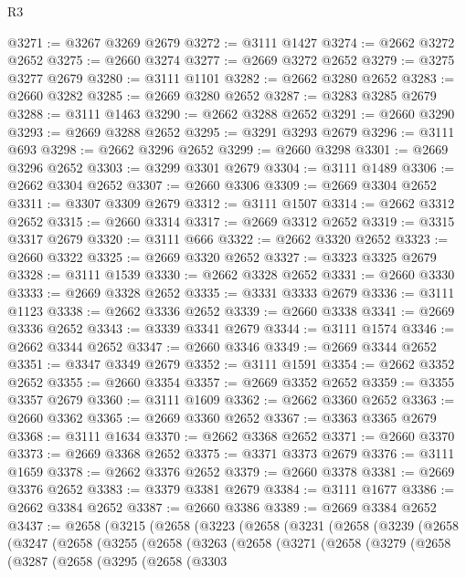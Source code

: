 \begin{lexlean}{R3}
\begin{coremodule}
@3271 := @3267 @3269 @2679
@3272 := @3111 @1427
@3274 := @2662 @3272 @2652
@3275 := @2660 @3274
@3277 := @2669 @3272 @2652
@3279 := @3275 @3277 @2679
@3280 := @3111 @1101
@3282 := @2662 @3280 @2652
@3283 := @2660 @3282
@3285 := @2669 @3280 @2652
@3287 := @3283 @3285 @2679
@3288 := @3111 @1463
@3290 := @2662 @3288 @2652
@3291 := @2660 @3290
@3293 := @2669 @3288 @2652
@3295 := @3291 @3293 @2679
@3296 := @3111 @693
@3298 := @2662 @3296 @2652
@3299 := @2660 @3298
@3301 := @2669 @3296 @2652
@3303 := @3299 @3301 @2679
@3304 := @3111 @1489
@3306 := @2662 @3304 @2652
@3307 := @2660 @3306
@3309 := @2669 @3304 @2652
@3311 := @3307 @3309 @2679
@3312 := @3111 @1507
@3314 := @2662 @3312 @2652
@3315 := @2660 @3314
@3317 := @2669 @3312 @2652
@3319 := @3315 @3317 @2679
@3320 := @3111 @666
@3322 := @2662 @3320 @2652
@3323 := @2660 @3322
@3325 := @2669 @3320 @2652
@3327 := @3323 @3325 @2679
@3328 := @3111 @1539
@3330 := @2662 @3328 @2652
@3331 := @2660 @3330
@3333 := @2669 @3328 @2652
@3335 := @3331 @3333 @2679
@3336 := @3111 @1123
@3338 := @2662 @3336 @2652
@3339 := @2660 @3338
@3341 := @2669 @3336 @2652
@3343 := @3339 @3341 @2679
@3344 := @3111 @1574
@3346 := @2662 @3344 @2652
@3347 := @2660 @3346
@3349 := @2669 @3344 @2652
@3351 := @3347 @3349 @2679
@3352 := @3111 @1591
@3354 := @2662 @3352 @2652
@3355 := @2660 @3354
@3357 := @2669 @3352 @2652
@3359 := @3355 @3357 @2679
@3360 := @3111 @1609
@3362 := @2662 @3360 @2652
@3363 := @2660 @3362
@3365 := @2669 @3360 @2652
@3367 := @3363 @3365 @2679
@3368 := @3111 @1634
@3370 := @2662 @3368 @2652
@3371 := @2660 @3370
@3373 := @2669 @3368 @2652
@3375 := @3371 @3373 @2679
@3376 := @3111 @1659
@3378 := @2662 @3376 @2652
@3379 := @2660 @3378
@3381 := @2669 @3376 @2652
@3383 := @3379 @3381 @2679
@3384 := @3111 @1677
@3386 := @2662 @3384 @2652
@3387 := @2660 @3386
@3389 := @2669 @3384 @2652
@3437 := @2658
    (@3215
      (@2658
        (@3223
          (@2658
            (@3231
              (@2658
                (@3239
                  (@2658
                    (@3247
                      (@2658
                        (@3255
                          (@2658
                            (@3263
                              (@2658
                                (@3271
                                  (@2658
                                    (@3279
                                      (@2658
                                        (@3287
                                          (@2658
                                            (@3295
                                              (@2658
                                                (@3303

\end{coremodule}
\end{lexlean}
